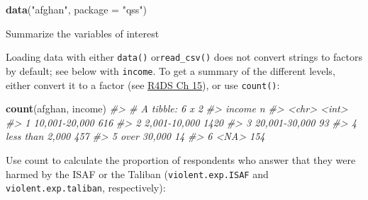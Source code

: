 \documentclass[]{book}
\newenvironment{Shaded}{\begin{snugshade}}{\end{snugshade}}
\newcommand{\CommentTok}[1]{\textcolor[rgb]{0.56,0.35,0.01}{\textit{#1}}}
\newcommand{\DataTypeTok}[1]{\textcolor[rgb]{0.13,0.29,0.53}{#1}}
\newcommand{\KeywordTok}[1]{\textcolor[rgb]{0.13,0.29,0.53}{\textbf{#1}}}
\newcommand{\NormalTok}[1]{#1}
\newcommand{\OperatorTok}[1]{\textcolor[rgb]{0.81,0.36,0.00}{\textbf{#1}}}
\newcommand{\StringTok}[1]{\textcolor[rgb]{0.31,0.60,0.02}{#1}}
\theoremstyle{definition}
\theoremstyle{definition}
\theoremstyle{definition}
\theoremstyle{remark}
\begin{document}
\begin{Shaded}
\begin{Highlighting}[]
\KeywordTok{data}\NormalTok{(}\StringTok{"afghan"}\NormalTok{, }\DataTypeTok{package =} \StringTok{"qss"}\NormalTok{)}
\end{Highlighting}
\end{Shaded}

Summarize the variables of interest

\begin{Shaded}
\end{Shaded}

Loading data with either \texttt{data()} or\texttt{read\_csv()} does not
convert strings to factors by default; see below with \texttt{income}.
To get a summary of the different levels, either convert it to a factor
(see \href{http://r4ds.had.co.nz/factors.html}{R4DS Ch 15}), or use
\texttt{count()}:

\begin{Shaded}
\begin{Highlighting}[]
\KeywordTok{count}\NormalTok{(afghan, income)}
\CommentTok{#> # A tibble: 6 x 2}
\CommentTok{#>   income              n}
\CommentTok{#>   <chr>           <int>}
\CommentTok{#> 1 10,001-20,000     616}
\CommentTok{#> 2 2,001-10,000     1420}
\CommentTok{#> 3 20,001-30,000      93}
\CommentTok{#> 4 less than 2,000   457}
\CommentTok{#> 5 over 30,000        14}
\CommentTok{#> 6 <NA>              154}
\end{Highlighting}
\end{Shaded}

Use count to calculate the proportion of respondents who answer that
they were harmed by the ISAF or the Taliban (\texttt{violent.exp.ISAF}
and \texttt{violent.exp.taliban}, respectively):
\end{document}

